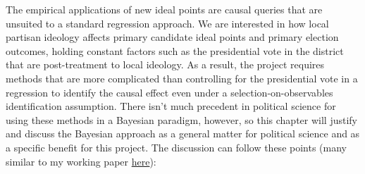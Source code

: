 \documentclass[12pt
              ]{article}
\begin{document}
The empirical applications of new ideal points are causal queries that are unsuited to a standard regression approach. We are interested in how local partisan ideology affects primary candidate ideal points and primary election outcomes, holding constant factors such as the presidential vote in the district that are post-treatment to local ideology. As a result, the project requires methods that are more complicated than controlling for the presidential vote in a regression to identify the causal effect even under a selection-on-observables identification assumption. There isn't much precedent in political science for using these methods in a Bayesian paradigm, however, so this chapter will justify and discuss the Bayesian approach as a general matter for political science and as a specific benefit for this project. The discussion can follow these points (many similar to my working paper \href{https://github.com/mikedecr/causal-bayes/blob/master/writing/causal-bayes-paper.pdf}{here}):
\end{document}
